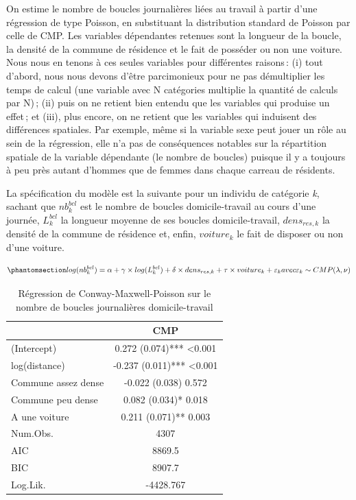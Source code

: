 \documentclass[
  9pt,
  a4paper,
  DIV=11]{scrreprt}
\begin{document}
On estime le nombre de boucles journalières liées au travail à partir
d'une régression de type Poisson, en substituant la distribution
standard de Poisson par celle de CMP. Les variables dépendantes retenues
sont la longueur de la boucle, la densité de la commune de résidence et
le fait de posséder ou non une voiture. Nous nous en tenons à ces seules
variables pour différentes raisons\,: (i) tout d'abord, nous nous devons
d'être parcimonieux pour ne pas démultiplier les temps de calcul (une
variable avec N catégories multiplie la quantité de calculs par N)\,;
(ii) puis on ne retient bien entendu que les variables qui produise un
effet\,; et (iii), plus encore, on ne retient que les variables qui
induisent des différences spatiales. Par exemple, même si la variable
sexe peut jouer un rôle au sein de la régression, elle n'a pas de
conséquences notables sur la répartition spatiale de la variable
dépendante (le nombre de boucles) puisque il y a toujours à peu près
autant d'hommes que de femmes dans chaque carreau de résidents.

La spécification du modèle est la suivante pour un individu de catégorie
\emph{k}, sachant que \(nb^{bcl}_k\) est le nombre de boucles
domicile-travail au cours d'une journée, \(L^{bcl}_k\) la longueur
moyenne de ses boucles domicile-travail, \(dens_{res,k}\) la densité de
la commune de résidence et, enfin, \(voiture_k\) le fait de disposer ou
non d'une voiture.

\begin{equation}\phantomsection\label{eq-reg-cmp}{
log(nb^{bcl}_k) = \alpha + \gamma \times log(L^{bcl}_k) + \delta \times dens_{res, k} + \tau \times voiture_k + \varepsilon_k \\avec \\ \varepsilon_k \sim CMP(\lambda, \nu)
}\end{equation}

\begin{longtable}{lc}

\caption{\label{tbl-reg-cmp}Régression de Conway-Maxwell-Poisson sur le
nombre de boucles journalières domicile-travail}

\tabularnewline

\toprule
  & CMP \\ 
\midrule\addlinespace[2.5pt]
(Intercept) & 0.272 (0.074)*** <0.001 \\ 
log(distance) & -0.237 (0.011)*** <0.001 \\ 
Commune assez dense & -0.022 (0.038) 0.572 \\ 
Commune peu dense & 0.082 (0.034)* 0.018 \\ 
A une voiture & 0.211 (0.071)** 0.003 \\ 
Num.Obs. & 4307 \\ 
AIC & 8869.5 \\ 
BIC & 8907.7 \\ 
Log.Lik. & -4428.767 \\ 
\bottomrule

\end{longtable}
\end{document}
